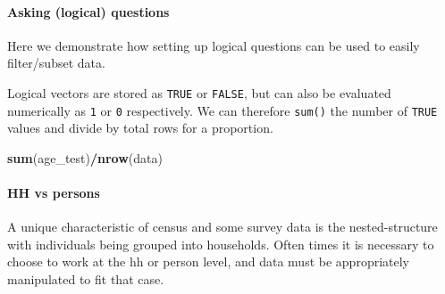 \documentclass[
]{book}
\newenvironment{Shaded}{\begin{snugshade}}{\end{snugshade}}
\newcommand{\DecValTok}[1]{\textcolor[rgb]{0.00,0.00,0.81}{#1}}
\newcommand{\FunctionTok}[1]{\textcolor[rgb]{0.13,0.29,0.53}{\textbf{#1}}}
\newcommand{\NormalTok}[1]{#1}
\newcommand{\OtherTok}[1]{\textcolor[rgb]{0.56,0.35,0.01}{#1}}
\newcommand{\SpecialCharTok}[1]{\textcolor[rgb]{0.81,0.36,0.00}{\textbf{#1}}}
\begin{document}
\hypertarget{asking-logical-questions}{%
\paragraph*{Asking (logical) questions}\label{asking-logical-questions}}

Here we demonstrate how setting up logical questions can be used to easily filter/subset data.

\begin{Shaded}
\end{Shaded}

Logical vectors are stored as \texttt{TRUE} or \texttt{FALSE}, but can also be evaluated numerically as \texttt{1} or \texttt{0} respectively. We can therefore \texttt{sum()} the number of \texttt{TRUE} values and divide by total rows for a proportion.

\begin{Shaded}
\begin{Highlighting}[]
\FunctionTok{sum}\NormalTok{(age\_test)}\SpecialCharTok{/}\FunctionTok{nrow}\NormalTok{(data)}
\end{Highlighting}
\end{Shaded}

\hypertarget{hh-vs-persons}{%
\paragraph*{HH vs persons}\label{hh-vs-persons}}

A unique characteristic of census and some survey data is the nested-structure with individuals being grouped into households. Often times it is necessary to choose to work at the hh or person level, and data must be appropriately manipulated to fit that case.

\begin{Shaded}
\end{Shaded}
\end{document}
